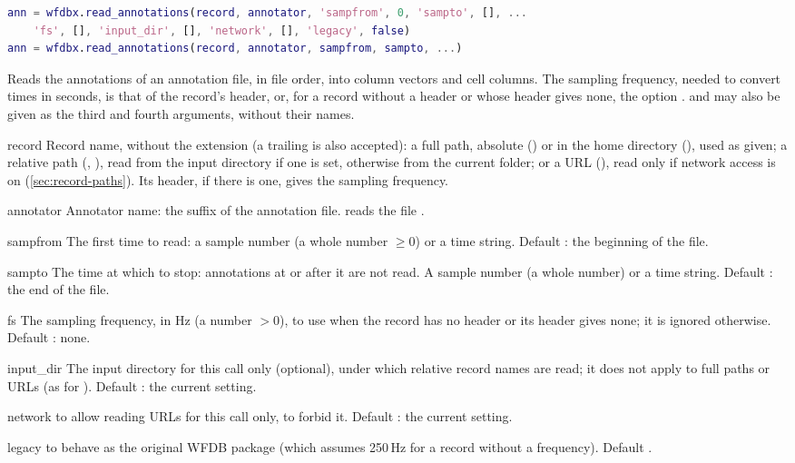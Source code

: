 \begin{lstlisting}[language=Matlab,style=signature]
ann = wfdbx.read_annotations(record, annotator, 'sampfrom', 0, 'sampto', [], ...
    'fs', [], 'input_dir', [], 'network', [], 'legacy', false)
ann = wfdbx.read_annotations(record, annotator, sampfrom, sampto, ...)
\end{lstlisting}
Reads the annotations of an annotation file, in file order, into column vectors and cell
columns. The sampling frequency, needed to convert times in seconds, is that of the
record's header, or, for a record without a header or whose header gives none, the option
.  and  may also be given as the third and
fourth arguments, without their names.
\begin{params}
\item[record] Record name, without the  extension (a trailing 
  is also accepted): a full path, absolute () or in the home
  directory (), used as given; a relative path
  (, ), read from the input directory if one is set,
  otherwise from the current folder; or a URL
  (), read only if network access is
  on (\cref{sec:record-paths}). Its header, if there is one, gives the
  sampling frequency.
\item[annotator] Annotator name: the suffix of the annotation file.  reads the
  file .
\item[sampfrom] The first time to read: a sample number (a whole number $\ge 0$) or a
  time string. Default : the beginning of the file.
\item[sampto] The time at which to stop: annotations at or after it are not read. A
  sample number (a whole number) or a time string. Default \code{[]}: the end of the
  file.
\item[fs] The sampling frequency, in Hz (a number $> 0$), to use when the record has no
  header or its header gives none; it is ignored otherwise. Default \code{[]}: none.
\item[input\_dir] The input directory for this call only (optional), under which
  relative record names are read; it does not apply to full paths or URLs (as for
  ). Default \code{[]}: the current setting.
\item[network]  to allow reading URLs for this call only,  to
  forbid it. Default \code{[]}: the current setting.
\item[legacy]  to behave as the original WFDB package (which assumes 250\,Hz
  for a record without a frequency). Default .
\end{params}
